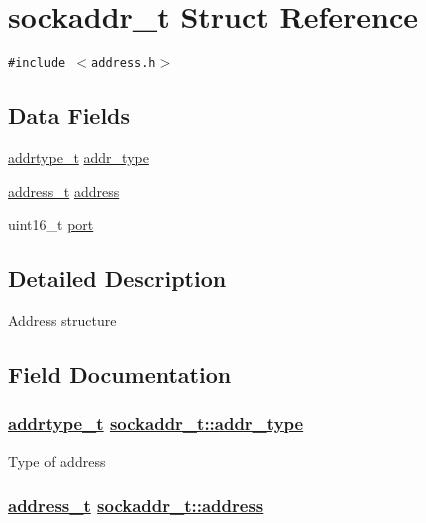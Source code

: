 \hypertarget{structsockaddr__t}{
\section{sockaddr\_\-t Struct Reference}
\label{structsockaddr__t}
}
{\tt \#include $<$address.h$>$}

\subsection*{Data Fields}
\begin{CompactItemize}
\item 
\hyperlink{address_8h_faf76b5591da0abd0584dec411d0551d}{addrtype\_\-t} \hyperlink{structsockaddr__t_5b8480a79b0daa43d1cd926017b36dca}{addr\_\-type}
\item 
\hyperlink{address_8h_65ce5a1faf29ab669a1d3dc6ce26c2ab}{address\_\-t} \hyperlink{structsockaddr__t_d024cc7932757d1c9d7bd19c9c23cb6c}{address}
\item 
uint16\_\-t \hyperlink{structsockaddr__t_b4544bc9ff62d1a9facbdf7a3ffcc8d2}{port}
\end{CompactItemize}


\subsection{Detailed Description}
Address structure 



\subsection{Field Documentation}
\hypertarget{structsockaddr__t_5b8480a79b0daa43d1cd926017b36dca}{
\subsubsection[addr\_\-type]{\setlength{\rightskip}{0pt plus 5cm}\hyperlink{address_8h_faf76b5591da0abd0584dec411d0551d}{addrtype\_\-t} \hyperlink{structsockaddr__t_5b8480a79b0daa43d1cd926017b36dca}{sockaddr\_\-t::addr\_\-type}}}
\label{structsockaddr__t_5b8480a79b0daa43d1cd926017b36dca}


Type of address \hypertarget{structsockaddr__t_d024cc7932757d1c9d7bd19c9c23cb6c}{
\subsubsection[address]{\setlength{\rightskip}{0pt plus 5cm}\hyperlink{address_8h_65ce5a1faf29ab669a1d3dc6ce26c2ab}{address\_\-t} \hyperlink{structsockaddr__t_d024cc7932757d1c9d7bd19c9c23cb6c}{sockaddr\_\-t::address}}}
\label{structsockaddr__t_d024cc7932757d1c9d7bd19c9c23cb6c}


